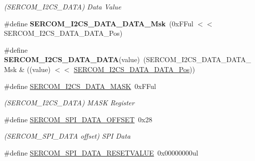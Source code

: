 \begin{DoxyCompactItemize}
\begin{DoxyCompactList}\small\item\em (S\+E\+R\+C\+O\+M\+\_\+\+I2\+C\+S\+\_\+\+D\+A\+T\+A) Data Value \end{DoxyCompactList}\item 
\hypertarget{group___s_a_m_l21___s_e_r_c_o_m_ga262933e700d7da8d9906ddced37c53f4}{}\#define {\bfseries S\+E\+R\+C\+O\+M\+\_\+\+I2\+C\+S\+\_\+\+D\+A\+T\+A\+\_\+\+D\+A\+T\+A\+\_\+\+Msk}~(0x\+F\+Ful $<$$<$ S\+E\+R\+C\+O\+M\+\_\+\+I2\+C\+S\+\_\+\+D\+A\+T\+A\+\_\+\+D\+A\+T\+A\+\_\+\+Pos)\label{group___s_a_m_l21___s_e_r_c_o_m_ga262933e700d7da8d9906ddced37c53f4}

\item 
\hypertarget{group___s_a_m_l21___s_e_r_c_o_m_ga44f2a2dfe8e1dc25c8922214037a1df1}{}\#define {\bfseries S\+E\+R\+C\+O\+M\+\_\+\+I2\+C\+S\+\_\+\+D\+A\+T\+A\+\_\+\+D\+A\+T\+A}(value)~(S\+E\+R\+C\+O\+M\+\_\+\+I2\+C\+S\+\_\+\+D\+A\+T\+A\+\_\+\+D\+A\+T\+A\+\_\+\+Msk \& ((value) $<$$<$ \hyperlink{group___s_a_m_l21___s_e_r_c_o_m_ga12ba9b88b0fe76770dd6a570d48e1f8b}{S\+E\+R\+C\+O\+M\+\_\+\+I2\+C\+S\+\_\+\+D\+A\+T\+A\+\_\+\+D\+A\+T\+A\+\_\+\+Pos}))\label{group___s_a_m_l21___s_e_r_c_o_m_ga44f2a2dfe8e1dc25c8922214037a1df1}

\item 
\hypertarget{group___s_a_m_l21___s_e_r_c_o_m_ga098e910db8ca0b69739485372339182a}{}\#define \hyperlink{group___s_a_m_l21___s_e_r_c_o_m_ga098e910db8ca0b69739485372339182a}{S\+E\+R\+C\+O\+M\+\_\+\+I2\+C\+S\+\_\+\+D\+A\+T\+A\+\_\+\+M\+A\+S\+K}~0x\+F\+Ful\label{group___s_a_m_l21___s_e_r_c_o_m_ga098e910db8ca0b69739485372339182a}

\begin{DoxyCompactList}\small\item\em (S\+E\+R\+C\+O\+M\+\_\+\+I2\+C\+S\+\_\+\+D\+A\+T\+A) M\+A\+S\+K Register \end{DoxyCompactList}\item 
\hypertarget{group___s_a_m_l21___s_e_r_c_o_m_ga83e4bab525aa946375107f1a0d894377}{}\#define \hyperlink{group___s_a_m_l21___s_e_r_c_o_m_ga83e4bab525aa946375107f1a0d894377}{S\+E\+R\+C\+O\+M\+\_\+\+S\+P\+I\+\_\+\+D\+A\+T\+A\+\_\+\+O\+F\+F\+S\+E\+T}~0x28\label{group___s_a_m_l21___s_e_r_c_o_m_ga83e4bab525aa946375107f1a0d894377}

\begin{DoxyCompactList}\small\item\em (S\+E\+R\+C\+O\+M\+\_\+\+S\+P\+I\+\_\+\+D\+A\+T\+A offset) S\+P\+I Data \end{DoxyCompactList}\item 
\hypertarget{group___s_a_m_l21___s_e_r_c_o_m_gacdd8d48701fa491da211f522e4dc1f0e}{}\#define \hyperlink{group___s_a_m_l21___s_e_r_c_o_m_gacdd8d48701fa491da211f522e4dc1f0e}{S\+E\+R\+C\+O\+M\+\_\+\+S\+P\+I\+\_\+\+D\+A\+T\+A\+\_\+\+R\+E\+S\+E\+T\+V\+A\+L\+U\+E}~0x00000000ul\label{group___s_a_m_l21___s_e_r_c_o_m_gacdd8d48701fa491da211f522e4dc1f0e}


\end{DoxyCompactItemize}
